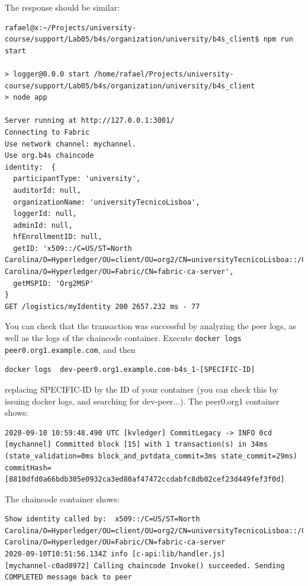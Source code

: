 \documentclass[12pt,a4paper]{article}
\theoremstyle{definition}
\begin{document}
The response should be similar:
\begin{verbatim}
rafael@x:~/Projects/university-course/support/Lab05/b4s/organization/university/b4s_client$ npm run start

> logger@0.0.0 start /home/rafael/Projects/university-course/support/Lab05/b4s/organization/university/b4s_client
> node app

Server running at http://127.0.0.1:3001/
Connecting to Fabric
Use network channel: mychannel.
Use org.b4s chaincode
identity:  {
  participantType: 'university',
  auditorId: null,
  organizationName: 'universityTecnicoLisboa',
  loggerId: null,
  adminId: null,
  hfEnrollmentID: null,
  getID: 'x509::/C=US/ST=North Carolina/O=Hyperledger/OU=client/OU=org2/CN=universityTecnicoLisboa::/C=US/ST=North Carolina/O=Hyperledger/OU=Fabric/CN=fabric-ca-server',
  getMSPID: 'Org2MSP'
}
GET /logistics/myIdentity 200 2657.232 ms - 77

\end{verbatim}

You can check that the transaction was successful by analyzing the peer logs, as well as the logs of the chaincode container. Execute \texttt{docker logs peer0.org1.example.com}, and then 

\begin{verbatim}
docker logs  dev-peer0.org1.example.com-b4s_1-[SPECIFIC-ID]
\end{verbatim}

replacing SPECIFIC-ID by the ID of your container (you can check this by issuing docker logs, and searching for dev-peer...).
The peer0.org1 container shows:
\begin{verbatim}
2020-09-10 10:59:48.490 UTC [kvledger] CommitLegacy -> INFO 0cd [mychannel] Committed block [15] with 1 transaction(s) in 34ms (state_validation=0ms block_and_pvtdata_commit=3ms state_commit=29ms) commitHash=[8810dfd0a66bdb305e0932ca3ed80af47472ccdabfc8db02cef23d449fef3f0d]
\end{verbatim}




The chaincode container shows:
\begin{verbatim}
Show identity called by:  x509::/C=US/ST=North Carolina/O=Hyperledger/OU=client/OU=org2/CN=universityTecnicoLisboa::/C=US/ST=North Carolina/O=Hyperledger/OU=Fabric/CN=fabric-ca-server
2020-09-10T10:51:56.134Z info [c-api:lib/handler.js]                              [mychannel-c0ad8972] Calling chaincode Invoke() succeeded. Sending COMPLETED message back to peer 
\end{verbatim}
\end{document}
